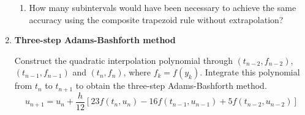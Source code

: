 \documentclass [12pt]{article}
\begin{document}
\begin{enumerate}
\begin{enumerate}
\item How many subintervals would have been necessary to achieve the same accuracy using the composite trapezoid rule without extrapolation?

\end{enumerate}

\item \textbf{Three-step Adams-Bashforth method} 

Construct the quadratic interpolation polynomial through
$(t_{n-2},f_{n-2})$, $(t_{n-1},f_{n-1})$ and $(t_n,f_n)$, where
$f_k=f(y_k)$. Integrate this polynomial from $t_n$ to $t_{n+1}$
to obtain the  three-step Adams-Bashforth method.
\[
u_{n+1}=u_n+\frac{h}{12}\left[23f(t_{n},u_{n})-16f(t_{n-1},u_{n-1})+5f(t_{n-2},u_{n-2})\right]
\]


\end{enumerate}
\end{document}
